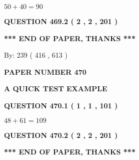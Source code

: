 \documentclass[12pt]{article}
\begin{document}
  
 
 

$ %
50 +  %
40=   %
90$
 
 
  
\vspace{0.2in}
  
{\textbf{\Large{QUESTION
469.2 
 ( 2 , 2 , 201 )
}}}
  
  
   
   
 \vspace{0.2in}
 
   
   
   
   
\vspace{1.0in} 
{\textbf{\large{ *** END OF PAPER, THANKS *** }}} 
   
   
\hspace{1.0in} By: 
 239 ( 416 ,  613 )
   
   
   
   
\newpage 
\setcounter{page}{ 
   470001 } 
   
   
   
   
 {\textbf{ \Large{ PAPER NUMBER  470  }}}
   
   
\vspace{0.2in}
   
   
   
   
   
   
 \vspace{0.2in}
{\LARGE {\textbf{ A QUICK TEST EXAMPLE}}}
   
   
  
\vspace{0.2in}
  
{\textbf{\Large{QUESTION
470.1 
 ( 1 , 1 , 101 )
}}}
  
  
 
 

$ %
48 +  %
61=   %
109$
 
 
  
\vspace{0.2in}
  
{\textbf{\Large{QUESTION
470.2 
 ( 2 , 2 , 201 )
}}}
  
  
   
   
 \vspace{0.2in}
 
   
   
   
   
\vspace{1.0in} 
{\textbf{\large{ *** END OF PAPER, THANKS *** }}} 
   
\end{document}
